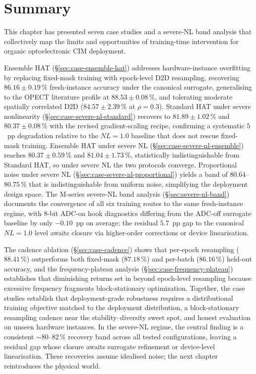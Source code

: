 \section{Summary}

This chapter has presented seven case studies and a severe-NL band analysis that collectively map the limits and opportunities of training-time intervention for organic optoelectronic CIM deployment.

Ensemble HAT (\S\ref{sec:case-ensemble-hat}) addresses hardware-instance overfitting by replacing fixed-mask training with epoch-level D2D resampling, recovering $86.16\pm0.19\,\%$ fresh-instance accuracy under the canonical surrogate, generalising to the OPECT literature profile at $88.53\pm0.08\,\%$, and tolerating moderate spatially correlated D2D ($84.57\pm2.39\,\%$ at $\rho=0.3$).  Standard HAT under severe nonlinearity (\S\ref{sec:case-severe-nl-standard}) recovers to $81.89\pm1.02\,\%$ and $80.37\pm0.08\,\%$ with the revised gradient-scaling recipe, confirming a systematic $5$~pp degradation relative to the $NL=1.0$ baseline that does not rescue fixed-mask training.  Ensemble HAT under severe NL (\S\ref{sec:case-severe-nl-ensemble}) reaches $80.37\pm0.59\,\%$ and $81.04\pm1.73\,\%$, statistically indistinguishable from Standard HAT, so under severe NL the two protocols converge.  Proportional noise under severe NL (\S\ref{sec:case-severe-nl-proportional}) yields a band of $80.64$--$80.75\,\%$ that is indistinguishable from uniform noise, simplifying the deployment design space.  The M-series severe-NL band analysis (\S\ref{sec:severe-nl-band}) documents the convergence of all six training routes to the same fresh-instance regime, with 8-bit ADC-on hook diagnostics differing from the ADC-off surrogate baseline by only $-0.10$~pp on average; the residual $5.7$~pp gap to the canonical $NL=1.0$ level awaits closure via higher-order corrections or device linearisation.

The cadence ablation (\S\ref{sec:case-cadence}) shows that per-epoch resampling ($88.41\,\%$) outperforms both fixed-mask ($87.18\,\%$) and per-batch ($86.16\,\%$) held-out accuracy, and the frequency-plateau analysis (\S\ref{sec:case-frequency-plateau}) establishes that diminishing returns set in beyond epoch-level resampling because excessive frequency fragments block-stationary optimization.  Together, the case studies establish that deployment-grade robustness requires a distributional training objective matched to the deployment distribution, a block-stationary resampling cadence near the stability--diversity sweet spot, and honest evaluation on unseen hardware instances.  In the severe-NL regime, the central finding is a consistent $\sim$80--82\,\% recovery band across all tested configurations, leaving a residual gap whose closure awaits surrogate refinement or device-level linearisation.  These recoveries assume idealised noise; the next chapter reintroduces the physical world.
